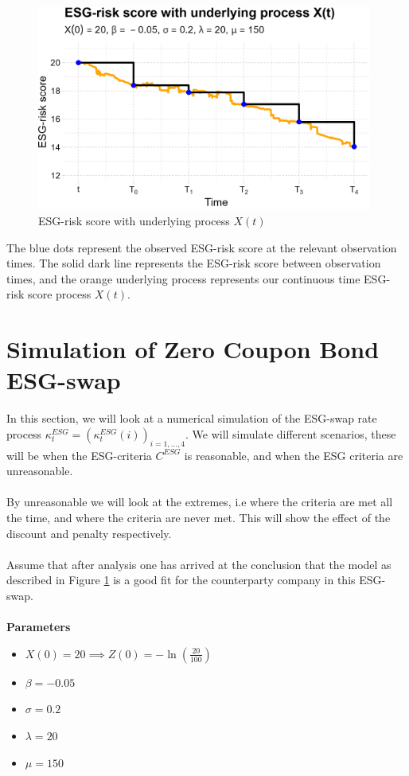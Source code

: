\begin{figure}[htp]
    \centering
    \includegraphics[width=11cm]{figures/ESG/Trajectory_X(t)_params.png}
    \caption{ESG-risk score with underlying process $X(t)$}
    \label{fig: ESG_risk_score_underlying_X(t)}
\end{figure}

The blue dots represent the observed ESG-risk score at the relevant observation times. The solid dark line represents the ESG-risk score between observation times, and the orange underlying process represents our continuous time ESG-risk score process $X(t)$.  

\newpage 

\section{Simulation of Zero Coupon Bond ESG-swap}

In this section, we will look at a numerical simulation of the ESG-swap rate process $\kappa_{t}^{ESG} = (\kappa_{t}^{ESG}(i))_{i=1, \dots, 4}$. We will simulate different scenarios, these will be when the ESG-criteria $C^{ESG}$ is reasonable, and when the ESG criteria are unreasonable. 
\\~\\
By unreasonable we will look at the extremes, i.e where the criteria are met all the time, and where the criteria are never met. This will show the effect of the discount and penalty respectively. 
\\~\\ 
Assume that after analysis one has arrived at the conclusion that the model as described in Figure \ref{fig: ESG_risk_score_underlying_X(t)} is a good fit for the counterparty company in this ESG-swap. 
\\~\\
\textbf{Parameters}
\begin{itemize}
    \item $X(0) = 20 \implies Z(0) = -\ln\left(\frac{20}{100}\right)$
    \item $\beta = -0.05$
    \item $\sigma = 0.2$
    \item $\lambda = 20$
    \item $\mu = 150$
\end{itemize}


